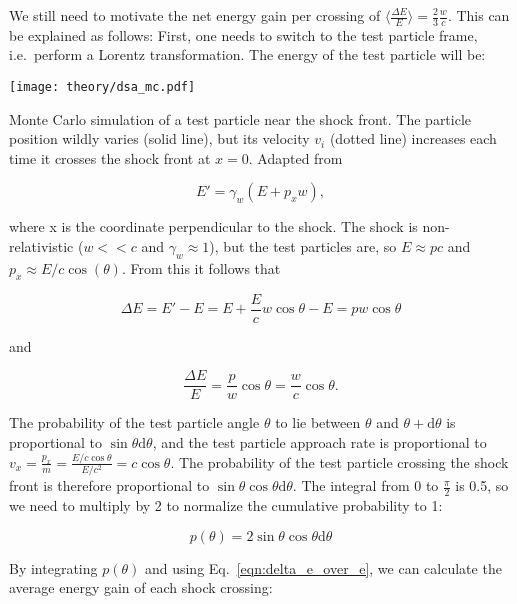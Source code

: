 We still need to motivate the net energy gain per crossing of $\big\langle\frac{\Delta E}{E}\big\rangle = \frac{2}{3}\frac{w}{c}$. This can be explained as follows: First, one needs to switch to the test particle frame, i.e.\ perform a Lorentz transformation. The energy of the test particle will be:

\begin{marginfigure}
    \texttt{[image: theory/dsa\_mc.pdf]}
    \caption[DSA Monte Carlo]{Monte Carlo simulation of a test particle near the shock front. The particle position wildly varies (solid line), but its velocity $v_i$ (dotted line) increases each time it crosses the shock front at $x=0$. Adapted from~\cite{Baring1997}}
\end{marginfigure}

\begin{equation}
    E' = \gamma_{w}(E+p_x w),
\end{equation}

where x is the coordinate perpendicular to the shock. The shock is non-relativistic ($w<<c$ and $\gamma_w\approx1$), but the test particles are, so $E\approx pc$ and $p_x \approx E/c \cos(\theta)$. From this it follows that

\begin{equation}
    \Delta E = E' - E = E+\frac{E}{c}w\cos{\theta}-E = pw\cos{\theta}
\end{equation}

and

\begin{equation}
    \frac{\Delta E}{E} = \frac{p}{w}\cos{\theta} = \frac{w}{c}\cos{\theta}.
    \label{eqn:delta_e_over_e}
\end{equation}

The probability of the test particle angle $\theta$ to lie between $\theta$ and $\theta + \text{d}\theta$ is proportional to $\sin{\theta}\text{d}\theta$, and the test particle approach rate is proportional to $v_x = \frac{p_x}{m} = \frac{E/c\cos{\theta}}{E/c^2} = c \cos{\theta}$. The probability of the test particle crossing the shock front is therefore proportional to $\sin{\theta} \cos{\theta} \text{d}\theta$. The integral from 0 to $\frac{\pi}{2}$ is 0.5, so we need to multiply by 2 to normalize the cumulative probability to 1:

\begin{equation}
    p(\theta) = 2\sin{\theta}\cos{\theta} \text{d}\theta
\end{equation}

By integrating $p(\theta)$ and using Eq.~\ref{eqn:delta_e_over_e}, we can calculate the average energy gain of each shock crossing:

